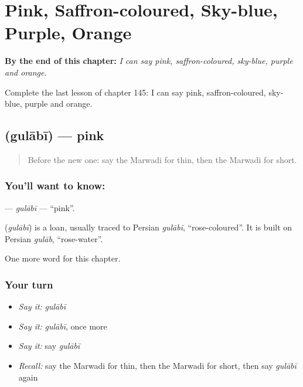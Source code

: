 
\chapter{Pink, Saffron-coloured, Sky-blue, Purple, Orange}
\label{ch:mw-pink-saffron-coloured-sky-blue-purple-orange}

\begin{chapteropening}
\textbf{By the end of this chapter:} \emph{I can say pink, saffron-coloured, sky-blue, purple and orange.}

Complete the last lesson of chapter 145: I can say pink, saffron-coloured, sky-blue, purple and orange.
\end{chapteropening}

\section[\texorpdfstring{\mw{गुलाबी} (gulābī)}{गुलाबी (gulābī)}]{ (gulābī) — pink}

\label{lesson:MW-C145-gulabi}



\begin{quote}
Before the new one: say the Marwadi for thin, then the Marwadi for short.
\end{quote}

\subsection*{You'll want to know: }
\textbf{} — \emph{gulābī} — \textquotedblleft{}pink\textquotedblright{}.

\begin{cousinweb}
\textbf{} (\emph{gulābī}) is a loan, usually traced to Persian \emph{gulābī}, \textquotedblleft{}rose-coloured\textquotedblright{}. It is built on Persian \emph{gulāb}, \textquotedblleft{}rose-water\textquotedblright{}.
\end{cousinweb}

\begin{grammarlens}[title={What you've built}]
One more word for this chapter.
\end{grammarlens}

\subsection*{Your turn}
\begin{itemize}
\raggedright
  \item \emph{Say it:} \emph{gulābī}
  \item \emph{Say it:} \emph{gulābī}, once more
  \item \emph{Say it:} say \emph{gulābī}
  \item \emph{Recall:} say the Marwadi for thin, then the Marwadi for short, then say \emph{gulābī} again
\end{itemize}

